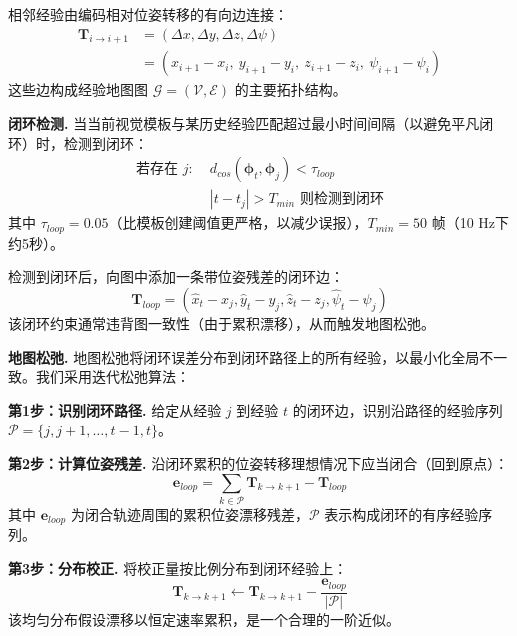 相邻经验由编码相对位姿转移的有向边连接：
\begin{align}
    \mathbf{T}_{i \to i+1} &= (\Delta x, \Delta y, \Delta z, \Delta \psi) \nonumber\\
    &= (x_{i+1} - x_i,\ y_{i+1} - y_i,\ z_{i+1} - z_i,\ \psi_{i+1} - \psi_i)
\end{align}
这些边构成经验地图图 $\mathcal{G} = (\mathcal{V}, \mathcal{E})$ 的主要拓扑结构。

\textbf{闭环检测.} 当当前视觉模板与某历史经验匹配超过最小时间间隔（以避免平凡闭环）时，检测到闭环：
\begin{equation}
    \begin{aligned}
        \text{若存在 } j:\; & d_{cos}(\boldsymbol{\phi}_t, \boldsymbol{\phi}_j) < \tau_{loop} \\
                                                      & |t - t_j| > T_{min} \text{ 则检测到闭环}
    \end{aligned}
\end{equation}
其中 $\tau_{loop} = 0.05$（比模板创建阈值更严格，以减少误报），$T_{min} = 50$ 帧（10 Hz下约5秒）。

检测到闭环后，向图中添加一条带位姿残差的闭环边：
\begin{equation}
    \mathbf{T}_{loop} = (\hat{x}_t - x_j, \hat{y}_t - y_j, \hat{z}_t - z_j, \hat{\psi}_t - \psi_j)
\end{equation}
该闭环约束通常违背图一致性（由于累积漂移），从而触发地图松弛。

\textbf{地图松弛.} 地图松弛将闭环误差分布到闭环路径上的所有经验，以最小化全局不一致。我们采用迭代松弛算法：

\textbf{第1步：识别闭环路径.} 给定从经验 $j$ 到经验 $t$ 的闭环边，识别沿路径的经验序列 $\mathcal{P} = \{j, j+1, \ldots, t-1, t\}$。

\textbf{第2步：计算位姿残差.} 沿闭环累积的位姿转移理想情况下应当闭合（回到原点）：
\begin{equation}
    \mathbf{e}_{loop} = \sum_{k \in \mathcal{P}} \mathbf{T}_{k \to k+1} - \mathbf{T}_{loop}
\end{equation}
其中 $\mathbf{e}_{loop}$ 为闭合轨迹周围的累积位姿漂移残差，$\mathcal{P}$ 表示构成闭环的有序经验序列。

\textbf{第3步：分布校正.} 将校正量按比例分布到闭环经验上：
\begin{equation}
    \mathbf{T}_{k \to k+1} \leftarrow \mathbf{T}_{k \to k+1} - \frac{\mathbf{e}_{loop}}{|\mathcal{P}|}
\end{equation}
该均匀分布假设漂移以恒定速率累积，是一个合理的一阶近似。

